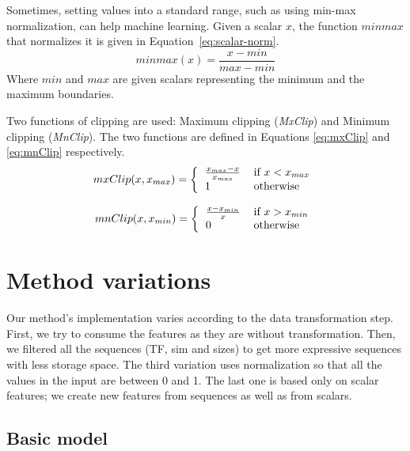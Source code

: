 Sometimes, setting values into a standard range, such as using min-max normalization, can help machine learning. 
Given a scalar $ x $, the function $ minmax $ that normalizes it is given in Equation~\ref{eq:scalar-norm}. 
\begin{equation}
\label{eq:scalar-norm}
minmax(x) = \frac{x - min}{max - min}
\end{equation}
Where $ min $ and $ max $ are given scalars representing the minimum and the maximum boundaries.


Two functions of clipping are used: Maximum clipping (\textit{MxClip}) and Minimum clipping (\textit{MnClip}). 
The two functions are defined in Equations \ref{eq:mxClip} and \ref{eq:mnClip} respectively.
%
\begin{equation}
\label{eq:mxClip}
mxClip(x, x_{max}) = \left\lbrace\begin{tabular}{ll}
$ \frac{x_{max} - x}{x_{max}} $ & if $ x < x_{max} $\\
$ 1 $ & otherwise \\
\end{tabular}\right. 
\end{equation}

\begin{equation}
\label{eq:mnClip}
mnClip(x, x_{min}) = \left\lbrace\begin{tabular}{ll}
$ \frac{x - x_{min}}{x} $ & if $ x > x_{min} $\\
$ 0 $ & otherwise \\
\end{tabular}\right. 
\end{equation}


\section{Method variations}

Our method's implementation varies according to the data transformation step. 
First, we try to consume the features as they are without transformation. 
Then, we filtered all the sequences (TF, sim and sizes) to get more expressive sequences with less storage space. 
The third variation uses normalization so that all the values in the input are between 0 and 1.
The last one is based only on scalar features; we create new features from sequences as well as from scalars.

\subsection{Basic model}

